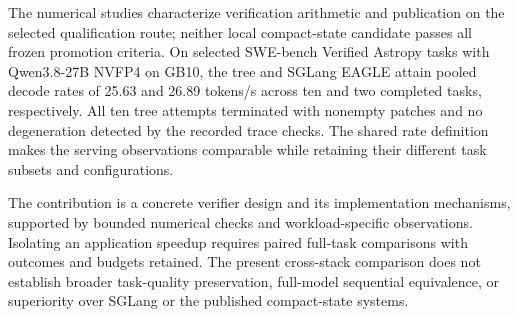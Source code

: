 \documentclass[conference]{IEEEtran}
\begin{document}
The numerical studies characterize verification arithmetic and publication on the selected qualification route; neither local compact-state candidate passes all frozen promotion criteria. On selected SWE-bench Verified Astropy tasks with Qwen3.8-27B NVFP4 on GB10, the tree and SGLang EAGLE attain pooled decode rates of 25.63 and 26.89 tokens/s across ten and two completed tasks, respectively. All ten tree attempts terminated with nonempty patches and no degeneration detected by the recorded trace checks. The shared rate definition makes the serving observations comparable while retaining their different task subsets and configurations.

The contribution is a concrete verifier design and its implementation mechanisms, supported by bounded numerical checks and workload-specific observations. Isolating an application speedup requires paired full-task comparisons with outcomes and budgets retained. The present cross-stack comparison does not establish broader task-quality preservation, full-model sequential equivalence, or superiority over SGLang or the published compact-state systems.
\end{document}
